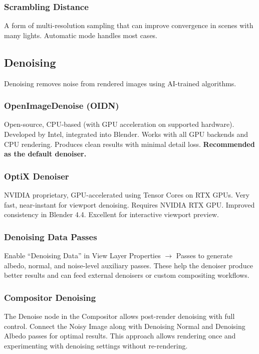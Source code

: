 \subsubsection{Scrambling Distance}

A form of multi-resolution sampling that can improve convergence in
scenes with many lights. Automatic mode handles most cases.

\subsection{Denoising}
\label{sec:shading:cycles:denoising}

Denoising removes noise from rendered images using AI-trained
algorithms.

\subsubsection{OpenImageDenoise (OIDN)}

Open-source, CPU-based (with GPU acceleration on supported
hardware). Developed by Intel, integrated into Blender. Works with
all GPU backends and CPU rendering. Produces clean results with
minimal detail loss. \textbf{Recommended as the default denoiser.}

\subsubsection{OptiX Denoiser}

NVIDIA proprietary, GPU-accelerated using Tensor Cores on RTX GPUs.
Very fast, near-instant for viewport denoising. Requires NVIDIA RTX
GPU. Improved consistency in Blender 4.4. Excellent for interactive
viewport preview.

\subsubsection{Denoising Data Passes}

Enable ``Denoising Data'' in View Layer Properties $\rightarrow$
Passes to generate albedo, normal, and noise-level auxiliary passes.
These help the denoiser produce better results and can feed external
denoisers or custom compositing workflows.

\subsubsection{Compositor Denoising}

The Denoise node in the Compositor allows post-render denoising with
full control. Connect the Noisy Image along with Denoising Normal
and Denoising Albedo passes for optimal results. This approach
allows rendering once and experimenting with denoising settings
without re-rendering.

